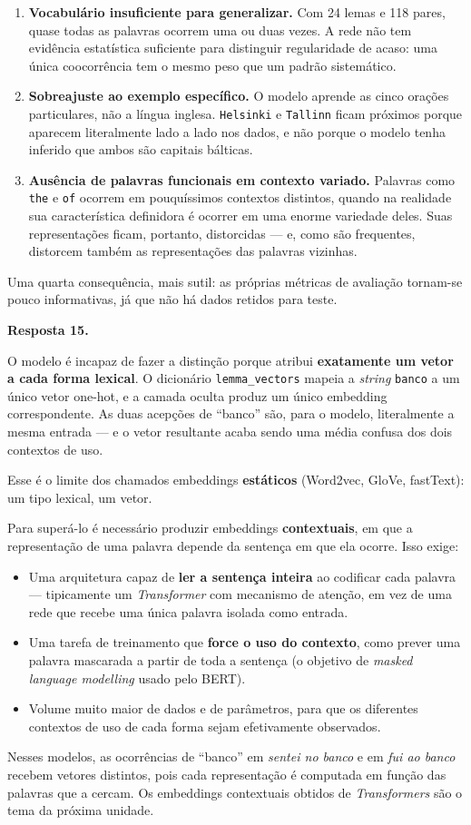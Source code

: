 \documentclass[
  brazilian,
]{article}
\providecommand{\tightlist}{%
  \setlength{\itemsep}{0pt}\setlength{\parskip}{0pt}}
\begin{document}
\begin{enumerate}
\def\labelenumi{\arabic{enumi}.}
\item
  \textbf{Vocabulário insuficiente para generalizar.} Com 24 lemas e 118
  pares, quase todas as palavras ocorrem uma ou duas vezes. A rede não
  tem evidência estatística suficiente para distinguir regularidade de
  acaso: uma única coocorrência tem o mesmo peso que um padrão
  sistemático.
\item
  \textbf{Sobreajuste ao exemplo específico.} O modelo aprende as cinco
  orações particulares, não a língua inglesa. \texttt{Helsinki} e
  \texttt{Tallinn} ficam próximos porque aparecem literalmente lado a
  lado nos dados, e não porque o modelo tenha inferido que ambos são
  capitais bálticas.
\item
  \textbf{Ausência de palavras funcionais em contexto variado.} Palavras
  como \texttt{the} e \texttt{of} ocorrem em pouquíssimos contextos
  distintos, quando na realidade sua característica definidora é ocorrer
  em uma enorme variedade deles. Suas representações ficam, portanto,
  distorcidas --- e, como são frequentes, distorcem também as
  representações das palavras vizinhas.
\end{enumerate}

Uma quarta consequência, mais sutil: as próprias métricas de avaliação
tornam-se pouco informativas, já que não há dados retidos para teste.

\textbf{Resposta 15.}

O modelo é incapaz de fazer a distinção porque atribui
\textbf{exatamente um vetor a cada forma lexical}. O dicionário
\texttt{lemma\_vectors} mapeia a \emph{string}
\texttt{\textquotesingle{}banco\textquotesingle{}} a um único vetor
one-hot, e a camada oculta produz um único embedding correspondente. As
duas acepções de ``banco'' são, para o modelo, literalmente a mesma
entrada --- e o vetor resultante acaba sendo uma média confusa dos dois
contextos de uso.

Esse é o limite dos chamados embeddings \textbf{estáticos} (Word2vec,
GloVe, fastText): um tipo lexical, um vetor.

Para superá-lo é necessário produzir embeddings \textbf{contextuais}, em
que a representação de uma palavra depende da sentença em que ela
ocorre. Isso exige:

\begin{itemize}
\tightlist
\item
  Uma arquitetura capaz de \textbf{ler a sentença inteira} ao codificar
  cada palavra --- tipicamente um \emph{Transformer} com mecanismo de
  atenção, em vez de uma rede que recebe uma única palavra isolada como
  entrada.
\item
  Uma tarefa de treinamento que \textbf{force o uso do contexto}, como
  prever uma palavra mascarada a partir de toda a sentença (o objetivo
  de \emph{masked language modelling} usado pelo BERT).
\item
  Volume muito maior de dados e de parâmetros, para que os diferentes
  contextos de uso de cada forma sejam efetivamente observados.
\end{itemize}

Nesses modelos, as ocorrências de ``banco'' em \emph{sentei no banco} e
em \emph{fui ao banco} recebem vetores distintos, pois cada
representação é computada em função das palavras que a cercam. Os
embeddings contextuais obtidos de \emph{Transformers} são o tema da
próxima unidade.
\end{document}
